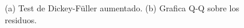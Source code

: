 %

\begin{figure}
	\centering
	\begin{subfigure}[b]{0.8\textwidth}
		\caption{}
		\label{fig:Ng1} 
	\end{subfigure}
	
	\begin{subfigure}[b]{0.8\textwidth}
		\caption{}
		\label{fig:Ng2}
	\end{subfigure}
	
	\caption[Ejemplo Modelo IPSA - CU - SP]{(a) Test de Dickey-Füller aumentado. (b) Grafica Q-Q sobre los residuos.}
\end{figure}
